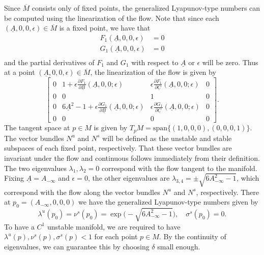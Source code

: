 Since \(\overline M\) consists only of fixed points, the generalized Lyapunov-type numbers can be computed using the linearization of the flow. Note that since each \((\underline A, 0, 0,\epsilon) \in \overline M\) is a fixed point, we have that
\begin{equation}
	\begin{aligned}
		F_1(\underline A, 0, 0, \epsilon) &= 0 \\
		G_1(\underline A, 0, 0, \epsilon) &= 0 \\
	\end{aligned}
\end{equation}
and the partial derivatives of \(F_1\) and \(G_1\) with respect to \(\underline A\) or \(\epsilon\) will be zero. Thus at a point \((\underline A, 0, 0, \epsilon) \in\overline M\), the linearization of the flow is given by
\begin{equation}
	\begin{bmatrix}
		0 & 1 + \epsilon \frac{\partial F_1}{\partial \underline B}(\underline A, 0, 0; \epsilon) & \epsilon \frac{\partial F_1}{\partial \underline C}(\underline A, 0, 0;\epsilon) & 0 \\
		0 & 0 & 1 & 0 \\
		0 & 6\underline A ^2 - 1 + \epsilon \frac{\partial G_1}{\partial \underline B}(\underline A, 0, 0; \epsilon) & \epsilon \frac{\partial G_1}{\partial \underline C}(\underline A, 0, 0; \epsilon) & 0 \\
		0 & 0 & 0 & 0
	\end{bmatrix}.
\end{equation}
The tangent space at \(p\in M\) is given by \(T_p M = \mathrm{span}\{(1,0,0,0), (0,0,0,1)\}\). The vector bundles \(N^u\) and \(N^s\) will be defined as the unstable and stable subspaces of each fixed point, respectively. That these vector bundles are invariant under the flow and continuous follows immediately from their definition. The two eigenvalues \(\lambda_1,\lambda_2=0\) correspond with the flow tangent to the manifold. Fixing \(\underline A = A_{-\infty}\) and \(\epsilon = 0\), the other eigenvalues are \(\lambda_{3,4} = \pm \sqrt{6A_{-\infty}^2-1}\), which correspond with the flow along the vector bundles \(N^u\) and \(N^s\), respectively. There at \(p_0 =(A_{-\infty}, 0, 0, 0)\)  we have the generalized Lyapunov-type numbers given by
\begin{equation}
	\lambda^u(p_0) = \nu^s(p_0) = \exp\big(-\sqrt{6A_{-\infty}^2-1}\big), \quad \sigma^s(p_0) = 0.
\end{equation}
To have a \(C^1\) unstable manifold, we are required to have \(\lambda^u(p), \nu^s(p), \sigma^s(p)  < 1\)  for each point \(p\in M\). By the continuity of eigenvalues, we can guarantee this by choosing \(\delta\) small enough.

